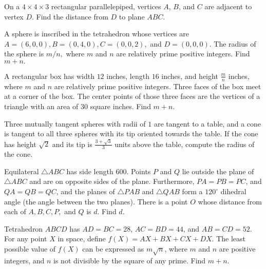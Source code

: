 \documentclass[mast]{lucky}
\begin{document}
\begin{prob}[AHSME 1996/28]{4}
On a $4\times 4\times 3$ rectangular parallelepiped, vertices $A$, $B$, and $C$ are adjacent to vertex $D$. Find the distance from $D$ to plane $ABC$.
\end{prob}

\begin{prob}[AIME I 2001/12]{6}
A sphere is inscribed in the tetrahedron whose vertices are $A = (6,0,0), B = (0,4,0), C = (0,0,2),$ and $D = (0,0,0).$ The radius of the sphere is $m/n,$ where $m$ and $n$ are relatively prime positive integers. Find $m + n.$
\end{prob}

\begin{prob}[AIME I 2013/7]{6}
A rectangular box has width $12$ inches, length $16$ inches, and height $\frac{m}{n}$ inches, where $m$ and $n$ are relatively prime positive integers. Three faces of the box meet at a corner of the box. The center points of those three faces are the vertices of a triangle with an area of $30$ square inches. Find $m+n$.
\end{prob}

\begin{req}[NARML 10]{9}
Three mutually tangent spheres with radii of $1$ are tangent to a table, and a cone is tangent to all three spheres with its tip oriented towards the table. If the cone has height $\sqrt{2}$ and its tip is $\tfrac{3+\sqrt{3}}{3}$ units above the table, compute the radius of the cone.
\end{req}

\begin{prob}[AIME II 2016/14]{13}
Equilateral $\triangle ABC$ has side length $600$. Points $P$ and $Q$ lie outside the plane of $\triangle ABC$ and are on opposite sides of the plane. Furthermore, $PA=PB=PC$, and $QA=QB=QC$, and the planes of $\triangle PAB$ and $\triangle QAB$ form a $120^{\circ}$ dihedral angle (the angle between the two planes). There is a point $O$ whose distance from each of $A,B,C,P,$ and $Q$ is $d$. Find $d$.
\end{prob}

\begin{prob}[AIME II 2017/15]{13}
Tetrahedron $ABCD$ has $AD=BC=28$, $AC=BD=44$, and $AB=CD=52$. For any point $X$ in space, define $f(X)=AX+BX+CX+DX$. The least possible value of $f(X)$ can be expressed as $m\sqrt{n}$, where $m$ and $n$ are positive integers, and $n$ is not divisible by the square of any prime. Find $m+n$.
\end{prob}
\end{document}
